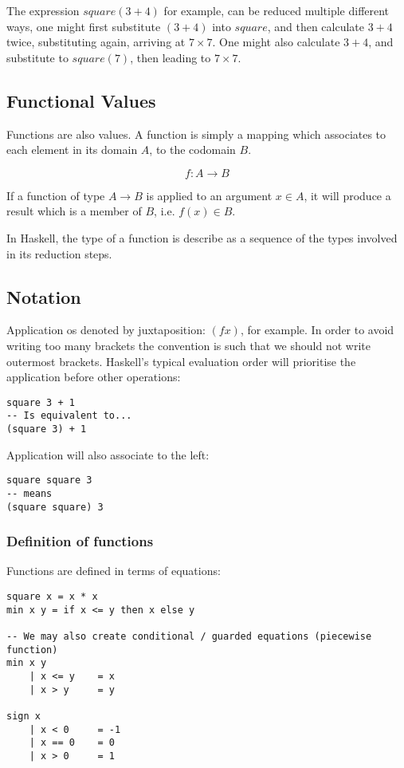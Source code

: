 The expression $square (3+4)$ for example, can be reduced multiple different ways, one might
first substitute $(3+4)$ into $square$, and then calculate $3+4$ twice, substituting again,
arriving at $7\times 7$. One might also calculate $3+4$, and substitute to $square(7)$, 
then leading to $7\times 7$.

\subsection{Functional Values}
Functions are also values. A function is simply a mapping which associates to each element
in its domain $A$, to the codomain $B$.

\begin{equation}
f:A\to B
\end{equation}

If a function of type $A\to B$ is applied to an argument $x\in A$, it will produce a result
which is a member of $B$, i.e. $f(x)\in B$.

In Haskell, the type of a function is describe as a sequence of the types involved in
its reduction steps.

\subsection{Notation}
Application os denoted by juxtaposition: $(f x)$, for example. In order to avoid writing too many brackets the
convention is such that we should not write outermost brackets. Haskell's typical evaluation order
will prioritise the application before other operations:

\begin{lstlisting}
square 3 + 1
-- Is equivalent to...
(square 3) + 1
\end{lstlisting}

Application will also associate to the left:
\begin{lstlisting}
square square 3
-- means
(square square) 3 
\end{lstlisting}


\subsubsection{Definition of functions}
Functions are defined in terms of equations:

\begin{lstlisting}
square x = x * x
min x y = if x <= y then x else y

-- We may also create conditional / guarded equations (piecewise function)
min x y
	| x <= y 	= x
	| x > y 	= y

sign x
	| x < 0		= -1
	| x == 0	= 0
	| x > 0 	= 1
\end{lstlisting}

